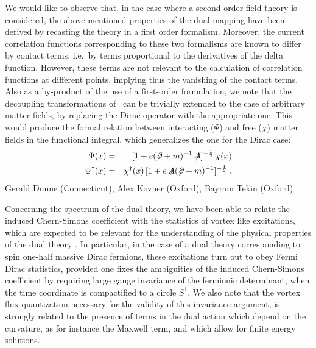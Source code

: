 \documentclass[a4paper,12pt]{article}
\begin{document}
We would like to observe that, in the case where a second order field
theory is considered, the above mentioned properties of the dual
mapping have been derived by recasting the theory in a first order
formalism. Moreover, the current correlation functions corresponding
to these two formalisms are known to differ by contact terms, i.e.\ by
terms proportional to the derivatives of the delta function. However,
these terms are not relevant to the calculation of correlation
functions at different points, implying thus the vanishing of the
contact terms.  Also as a by-product of the use of a first-order
formulation, we note that the decoupling transformations
of~\cite{Fosco:1998gm} can be trivially extended to the case of
arbitrary matter fields, by replacing the Dirac operator with the
appropriate one. This would produce the formal relation between
interacting ($\Psi$) and free ($\chi$) matter fields in the functional
integral, which generalizes the one for the Dirac case:
\begin{eqnarray}
\Psi (x) &=& [1 + e (\not \! \partial + m)^{-1}
\not \!\! A]^{-\frac{1}{2}}\,\chi (x)\nonumber\\
\Psi^\dagger (x) &=& \chi^\dagger (x)\,[1 +
e\not \!\! A (\not \! \partial + m)^{-1} ]^{-\frac{1}{2}} \;.
\label{deft3}
\end{eqnarray}Gerald Dunne (Connecticut), Alex Kovner (Oxford), Bayram Tekin (Oxford)


Concerning the spectrum of the dual theory, we have been able to
relate the induced Chern-Simons coefficient with the statistics of
vortex like excitations, which are expected to be relevant for the
understanding of the physical properties of the dual theory {\cite{kov}}. In
particular, in the case of a dual theory corresponding to spin
one-half massive Dirac fermions, these excitations turn out to obey
Fermi Dirac statistics, provided one fixes the ambiguities of the
induced Chern-Simons coefficient by requiring large gauge invariance
of the fermionic determinant, when the time coordinate is compactified
to a circle $S^1$. We also note that the vortex flux quantization
necessary for the validity of this invariance argument, is strongly
related to the presence of terms in the dual action which depend on
the curvature, as for instance the Maxwell term, and which allow for
finite energy solutions.
\end{document}

